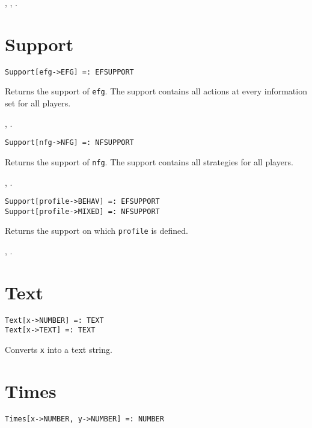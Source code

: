 \seealso {},
,
.


\section*{Support}\label{PrimSupport}
\begin{verbatim}
Support[efg->EFG] =: EFSUPPORT 
\end{verbatim}

\noindent
Returns the support of \verb+efg+.  The support contains all actions at every
information set for all players.

\seealso {},
.

\newsignature

\begin{verbatim}
Support[nfg->NFG] =: NFSUPPORT 
\end{verbatim}

\noindent
Returns the support of \verb+nfg+.  The support contains all strategies
for all players.

\seealso {},
.

\newsignature

\begin{verbatim}
Support[profile->BEHAV] =: EFSUPPORT 
Support[profile->MIXED] =: NFSUPPORT 
\end{verbatim}

\noindent
Returns the support on which \verb+profile+ is defined.

\seealso {}, .


\section*{Text}\label{PrimText}
\begin{verbatim}
Text[x->NUMBER] =: TEXT 
Text[x->TEXT] =: TEXT 
\end{verbatim}

\noindent
Converts \texttt{x} into a text string.


\section*{Times}\label{PrimTimes}
\begin{verbatim}
Times[x->NUMBER, y->NUMBER] =: NUMBER 
\end{verbatim}

